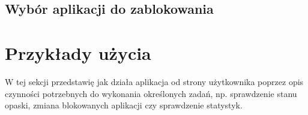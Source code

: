 \subsection{Wybór aplikacji do zablokowania}

\section{Przykłady użycia}
W tej sekcji przedstawię jak działa aplikacja od strony użytkownika poprzez opis czynności potrzebnych do wykonania określonych zadań, np. sprawdzenie stanu opaski, zmiana blokowanych aplikacji czy sprawdzenie statystyk.